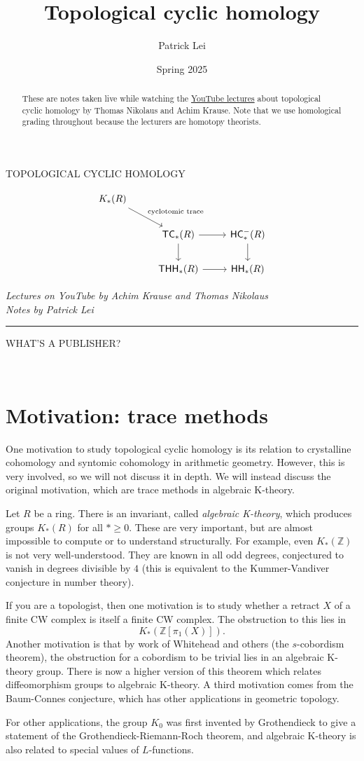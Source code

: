 \documentclass[10pt, oneside]{memoir}
\title{Topological cyclic homology}
\author{Patrick Lei}
\date{Spring 2025}
\theoremstyle{definition}
\theoremstyle{remark}
\theoremstyle{plain}
\theoremstyle{definition}
\theoremstyle{remark}
\newcommand{\Z}{\mathbb{Z}}
\newcommand{\ms}[1]{\mathsf{#1}}
\newcommand{\1}{\mathbf{1}}
\newcommand{\2}{\mathbf{2}}
\newcommand{\3}{\mathbf{3}}
\newcommand{\HC}{\ms{HC}}
\newcommand{\THH}{\ms{THH}}
\newcommand{\TC}{\ms{TC}}
\newcommand{\HH}{\ms{HH}}
\newcommand*{\titleGWP}{\begingroup%
\newlength{\drop}
\setlength{\drop}{0.1\textheight}
\vspace*{\drop}
\begin{center}
\Huge\color{violet}
TOPOLOGICAL CYCLIC HOMOLOGY
\end{center}
\vfill
\begin{center}
{\begin{equation*}
    \begin{tikzcd}[ampersand replacement=\&]
        K_*(R) \ar{dr}{\text{cyclotomic trace}} \\
        \& \TC_*(R) \ar{r} \ar{d} \& \HC_*^-(R) \ar{d} \\
        \& \THH_*(R) \ar{r} \& \HH_*(R)
    \end{tikzcd}
    \end{equation*}}
\end{center}
\vfill
\begin{center}
\large
{\itshape Lectures on YouTube by Achim Krause and Thomas Nikolaus \\
\normalsize
Notes by Patrick Lei} \\
{\color{violet} \rule{\textwidth}{0.4pt}}
WHAT'S A PUBLISHER?
\end{center}
\vspace*{0.5\drop}
\endgroup}
\begin{document}
\titleGWP\thispagestyle{empty}
\newpage
\ \thispagestyle{empty}
\newpage
\vfill
\begin{abstract}\thispagestyle{empty}
    These are notes taken live while watching the \href{https://www.youtube.com/playlist?list=PLsmqTkj4MGTB8pNGvW0iuKUFmBlOSke-C}{YouTube lectures} about topological cyclic homology by Thomas Nikolaus and Achim Krause. Note that we use homological grading throughout because the lecturers are homotopy theorists.
\end{abstract}
\vfill
\clearpage
\tableofcontents
\clearpage

\section*{Motivation: trace methods}%
\label{sec:Motivation}

One motivation to study topological cyclic homology is its relation to crystalline cohomology and syntomic cohomology in arithmetic geometry. However, this is very involved, so we will not discuss it in depth. We will instead discuss the original motivation, which are trace methods in algebraic K-theory.

Let $R$ be a ring. There is an invariant, called \textit{algebraic K-theory}, which produces groups $K_*(R)$ for all $* \geq 0$. These are very important, but are almost impossible to compute or to understand structurally. For example, even $K_*(\Z)$ is not very well-understood. They are known in all odd degrees, conjectured to vanish in degrees divisible by $4$ (this is equivalent to the Kummer-Vandiver conjecture in number theory). 

If you are a topologist, then one motivation is to study whether a retract $X$ of a finite CW complex is itself a finite CW complex. The obstruction to this lies in 
\[
    K_*(\Z[\pi_1(X)]).
\]
Another motivation is that by work of Whitehead and others (the $s$-cobordism theorem), the obstruction for a cobordism to be trivial lies in an algebraic K-theory group. There is now a higher version of this theorem which relates diffeomorphism groups to algebraic K-theory. A third motivation comes from the Baum-Connes conjecture, which has other applications in geometric topology. 

For other applications, the group $K_0$ was first invented by Grothendieck to give a statement of the Grothendieck-Riemann-Roch theorem, and algebraic K-theory is also related to special values of $L$-functions. 
\end{document}
